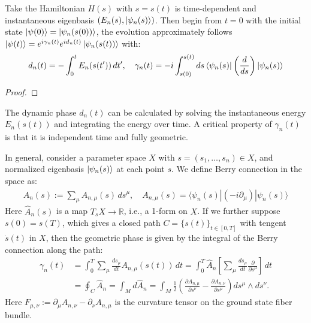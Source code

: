 \begin{theorem}
Take the Hamiltonian $H(s)$ with $s = s(t)$ is time-dependent and instantaneous eigenbasis $(E_n(s),\ket{\psi_n(s)})$.
Then begin from $t = 0$ with the initial state $\ket{\psi(0)} = \ket{\psi_n(s(0))}$, the evolution approximately follows $\ket{\psi(t)} = e^{i\gamma_n(t)} e^{id_n(t)} \ket{\psi_n(s(t))}$ with:
\begin{align}
d_n(t) = -\int_0^t E_n(s(t'))\,dt',\quad  \gamma_n(t) = - i\int_{s(0)}^{s(t)}ds \bra{\psi_n(s)} \left(\frac{d}{ds}\right) \ket{\psi_n(s)} 
\end{align}
\end{theorem}
\begin{proof}
    
\end{proof}


The dynamic phase $d_n(t)$ can be calculated by solving the instantaneous energy $E_n(s(t))$ and integrating the energy over time.
A critical property of $\gamma_n(t)$ is that it is independent time and fully geometric. 

In general, consider a parameter space $X$ with $s=(s_1,\dots,s_n)\in X$,
and normalized eigenbasis $\ket{\psi_n(s)}$ at each point $s$.
We define Berry connection in the space as:
\begin{align}
\hat{A}_n(s) :=
\sum_\mu {A}_{n,\mu}(s)  \,ds^\mu, \quad {A}_{n,\mu}(s) = \langle \psi_n(s)|(-i\partial_\mu) |\psi_n(s)\rangle 
\end{align}
Here $\hat{A}_n(s)$ is a map $T_{s} X \to \mathbb{R}$, i.e., a 1-form on $X$.
If we further suppose $s(0) = s(T)$, which gives a closed path $C = \{s(t)\}_{t\in [0,T]}$ with tengent $\dot{s}(t)$ in $X$,
 then the geometric phase is given by the integral of the Berry connection along the path:
\begin{align}
\gamma_n(t)  &= \int_0^T \sum_\mu \frac{ds_\mu}{dt} {A}_{n,\mu}(s(t)) \,dt = \int_0^T \hat{A}_n \left[\sum_\mu \frac{ds_\mu}{dt} \frac{\partial}{\partial s^\mu}\right]\,dt  \\
&= \oint_C \hat{A}_n =\int_M d\hat{A}_n = \int_M \frac{1}{2} \left(\frac{\partial {A}_{n,\mu}}{\partial s^\nu} - \frac{\partial {A}_{n,\nu}}{\partial s^\mu}\right) ds^{\mu} \wedge ds^{\nu}.
\end{align}
Here $F_{\mu,\nu}:= {\partial_{\mu} {A}_{n,\nu}} - {\partial_{\nu} {A}_{n,\mu}}$ is the curvature tensor on the ground state fiber bundle.
